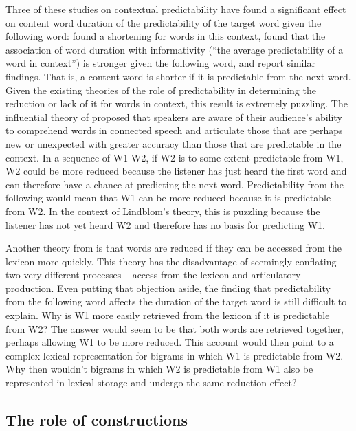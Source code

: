 \documentclass[output=paper]{langscibook}
\begin{document}
Three of these studies on contextual predictability have found a significant effect on content word duration of the predictability of the target word given the following word: \citet{BellJurafsky2009} found a shortening for words in this context, \citet{Seyfarth2014} found that the association of word duration with informativity (``the average predictability of a word in context'') is stronger given the following word, and \citet{SóskuthyHay2017} report similar findings. That is, a content word is shorter if it is predictable from the next word. Given the existing theories of the role of predictability in determining the reduction or lack of it for words in context, this result is extremely puzzling. The influential theory of \citet{Lindblom1990} proposed that speakers are aware of their audience’s ability to comprehend words in connected speech and articulate those that are perhaps new or unexpected with greater accuracy than those that are predictable in the context. In a sequence of W1 W2, if W2 is to some extent predictable from W1, W2 could be more reduced because the listener has just heard the first word and can therefore have a chance at predicting the next word. Predictability from the following would mean that W1 can be more reduced because it is predictable from W2. In the context of Lindblom’s theory, this is puzzling because the listener has not yet heard W2 and therefore has no basis for predicting W1. 

Another theory from \citet{BellJurafsky2009} is that words are reduced if they can be accessed from the lexicon more quickly. This theory has the disadvantage of seemingly conflating two very different processes -- access from the lexicon and articulatory production. Even putting that objection aside, the finding that predictability from the following word affects the duration of the target word is still difficult to explain. Why is W1 more easily retrieved from the lexicon if it is predictable from W2? The answer would seem to be that both words are retrieved together, perhaps allowing W1 to be more reduced. This account would then point to a complex lexical representation for bigrams in which W1 is predictable from W2. Why then wouldn’t bigrams in which W2 is predictable from W1 also be represented in lexical storage and undergo the same reduction effect? 

\subsection{The role of constructions}\label{sec:bybee:1.4}
\end{document}
